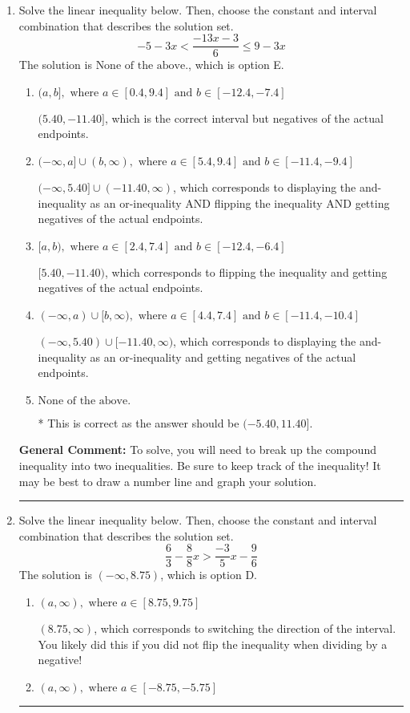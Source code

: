 \documentclass{extbook}[14pt]
\newcommand{\litem}[1]{\item #1

\rule{\textwidth}{0.4pt}}
\begin{document}
\begin{enumerate}\litem{
Solve the linear inequality below. Then, choose the constant and interval combination that describes the solution set.
\[ -5 - 3 x < \frac{-13 x - 3}{6} \leq 9 - 3 x \]The solution is \( \text{None of the above.} \), which is option E.\begin{enumerate}[label=\Alph*.]
\item \( (a, b], \text{ where } a \in [0.4, 9.4] \text{ and } b \in [-12.4, -7.4] \)

$(5.40, -11.40]$, which is the correct interval but negatives of the actual endpoints.
\item \( (-\infty, a] \cup (b, \infty), \text{ where } a \in [5.4, 9.4] \text{ and } b \in [-11.4, -9.4] \)

$(-\infty, 5.40] \cup (-11.40, \infty)$, which corresponds to displaying the and-inequality as an or-inequality AND flipping the inequality AND getting negatives of the actual endpoints.
\item \( [a, b), \text{ where } a \in [2.4, 7.4] \text{ and } b \in [-12.4, -6.4] \)

$[5.40, -11.40)$, which corresponds to flipping the inequality and getting negatives of the actual endpoints.
\item \( (-\infty, a) \cup [b, \infty), \text{ where } a \in [4.4, 7.4] \text{ and } b \in [-11.4, -10.4] \)

$(-\infty, 5.40) \cup [-11.40, \infty)$, which corresponds to displaying the and-inequality as an or-inequality and getting negatives of the actual endpoints.
\item \( \text{None of the above.} \)

* This is correct as the answer should be $(-5.40, 11.40]$.
\end{enumerate}

\textbf{General Comment:} To solve, you will need to break up the compound inequality into two inequalities. Be sure to keep track of the inequality! It may be best to draw a number line and graph your solution.
}
\litem{
Solve the linear inequality below. Then, choose the constant and interval combination that describes the solution set.
\[ \frac{6}{3} - \frac{8}{8} x > \frac{-3}{5} x - \frac{9}{6} \]The solution is \( (-\infty, 8.75) \), which is option D.\begin{enumerate}[label=\Alph*.]
\item \( (a, \infty), \text{ where } a \in [8.75, 9.75] \)

 $(8.75, \infty)$, which corresponds to switching the direction of the interval. You likely did this if you did not flip the inequality when dividing by a negative!
\item \( (a, \infty), \text{ where } a \in [-8.75, -5.75] \)


\end{enumerate}}
\end{enumerate}
\end{document}
